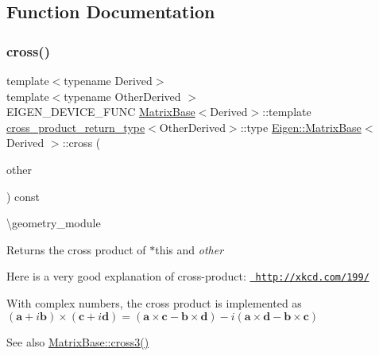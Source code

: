\subsection{Function Documentation}
\mbox{\label{group___geometry___module_gacbaa31c2b67323d82aed4f1c1f68a1fc}} 
\subsubsection{\texorpdfstring{cross()}{cross()}\hspace{0.1cm}{\footnotesize\ttfamily [1/2]}}
{\footnotesize\ttfamily template$<$typename Derived$>$ \\
template$<$typename Other\+Derived $>$ \\
E\+I\+G\+E\+N\+\_\+\+D\+E\+V\+I\+C\+E\+\_\+\+F\+U\+NC \mbox{\hyperlink{class_eigen_1_1_matrix_base}{Matrix\+Base}}$<$Derived$>$\+::template \mbox{\hyperlink{struct_eigen_1_1_matrix_base_1_1cross__product__return__type}{cross\+\_\+product\+\_\+return\+\_\+type}}$<$Other\+Derived$>$\+::type \mbox{\hyperlink{class_eigen_1_1_matrix_base}{Eigen\+::\+Matrix\+Base}}$<$ Derived $>$\+::cross (\begin{DoxyParamCaption}\item[{const \mbox{\hyperlink{class_eigen_1_1_matrix_base}{Matrix\+Base}}$<$ Other\+Derived $>$ \&}]{other }\end{DoxyParamCaption}) const\hspace{0.3cm}{\ttfamily [inline]}}

\textbackslash{}geometry\+\_\+module

\begin{DoxyReturn}{Returns}
the cross product of {\ttfamily $\ast$this} and {\itshape other} 
\end{DoxyReturn}
Here is a very good explanation of cross-\/product\+: \href{http://xkcd.com/199/}{\texttt{ http\+://xkcd.\+com/199/}}

With complex numbers, the cross product is implemented as $ (\mathbf{a}+i\mathbf{b}) \times (\mathbf{c}+i\mathbf{d}) = (\mathbf{a} \times \mathbf{c} - \mathbf{b} \times \mathbf{d}) - i(\mathbf{a} \times \mathbf{d} - \mathbf{b} \times \mathbf{c})$

\begin{DoxySeeAlso}{See also}
\mbox{\hyperlink{group___geometry___module_gaf10988c8393785423ae68a5afdf83226}{Matrix\+Base\+::cross3()}} 
\end{DoxySeeAlso}
\mbox{\label{group___geometry___module_gab3efae0c028a63a41cccb94d978d1437}} 
